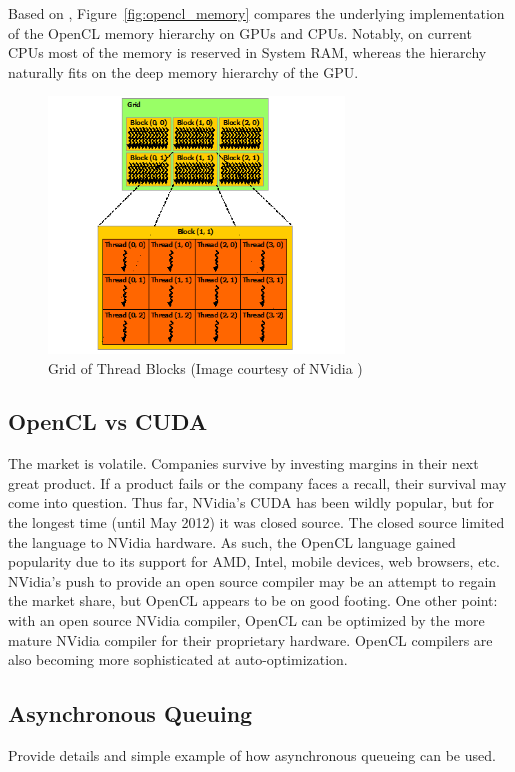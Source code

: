 \documentclass{report}
\begin{document}
Based on \cite{Behr:2009, OpenCL:2009}, Figure~\ref{fig:opencl_memory} compares the underlying implementation of the OpenCL memory hierarchy on GPUs and CPUs. Notably, on current CPUs most of the memory is reserved in System RAM, whereas the hierarchy naturally fits on the deep memory hierarchy of the GPU. 


\begin{figure}
\centering
\includegraphics[width=0.7\textwidth]{gpu_content/nvidia_figures/grid-of-thread-blocks.png}
\caption{Grid of Thread Blocks (Image courtesy of NVidia \cite{CudaGuide2013})} 
\label{fig:grid-of-thread-blocks}
\end{figure}


\subsection{OpenCL vs CUDA}
The market is volatile. Companies survive by investing margins in their next great product. If a product fails or the company faces a recall, their survival may come into question. Thus far, NVidia's CUDA has been wildly popular, but for the longest time (until May 2012) it was closed source. The closed source limited the language to NVidia hardware. As such, the OpenCL language gained popularity due to its support for AMD, Intel, mobile devices, web browsers, etc. NVidia's push to provide an open source compiler may be an attempt to regain the market share, but OpenCL appears to be on good footing. One other point: with an open source NVidia compiler, OpenCL can be optimized by the more mature NVidia compiler for their proprietary hardware. OpenCL compilers are also becoming more sophisticated at auto-optimization. 

\subsection{Asynchronous Queuing} 
Provide details and simple example of how asynchronous queueing can be used. 
\end{document}
